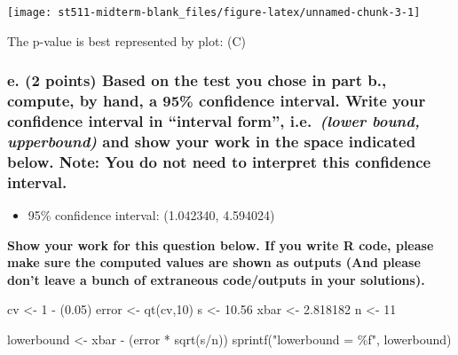 \documentclass[
]{article}
\newenvironment{Shaded}{\begin{snugshade}}{\end{snugshade}}
\newcommand{\DecValTok}[1]{\textcolor[rgb]{0.00,0.00,0.81}{#1}}
\newcommand{\FloatTok}[1]{\textcolor[rgb]{0.00,0.00,0.81}{#1}}
\newcommand{\FunctionTok}[1]{\textcolor[rgb]{0.00,0.00,0.00}{#1}}
\newcommand{\NormalTok}[1]{#1}
\newcommand{\OtherTok}[1]{\textcolor[rgb]{0.56,0.35,0.01}{#1}}
\newcommand{\SpecialCharTok}[1]{\textcolor[rgb]{0.00,0.00,0.00}{#1}}
\newcommand{\StringTok}[1]{\textcolor[rgb]{0.31,0.60,0.02}{#1}}
\providecommand{\tightlist}{%
  \setlength{\itemsep}{0pt}\setlength{\parskip}{0pt}}
\begin{document}
\begin{center}\texttt{[image: st511-midterm-blank\_files/figure-latex/unnamed-chunk-3-1]} \end{center}

The p-value is best represented by plot: (C)

\hypertarget{e.-2-points-based-on-the-test-you-chose-in-part-b.-compute-by-hand-a-95-confidence-interval.-write-your-confidence-interval-in-interval-form-i.e.-lower-bound-upperbound-and-show-your-work-in-the-space-indicated-below.-note-you-do-not-need-to-interpret-this-confidence-interval.}{%
\subsubsection{\texorpdfstring{e. (2 points) Based on the test you chose
in part b., compute, by hand, a 95\% confidence interval. Write your
confidence interval in ``interval form'', i.e.~\emph{(lower bound,
upperbound)} and show your work in the space indicated below. Note: You
do not need to interpret this confidence
interval.}{e. (2 points) Based on the test you chose in part b., compute, by hand, a 95\% confidence interval. Write your confidence interval in ``interval form'', i.e.~(lower bound, upperbound) and show your work in the space indicated below. Note: You do not need to interpret this confidence interval.}}\label{e.-2-points-based-on-the-test-you-chose-in-part-b.-compute-by-hand-a-95-confidence-interval.-write-your-confidence-interval-in-interval-form-i.e.-lower-bound-upperbound-and-show-your-work-in-the-space-indicated-below.-note-you-do-not-need-to-interpret-this-confidence-interval.}}

\begin{itemize}
\tightlist
\item
  95\% confidence interval: (1.042340, 4.594024)
\end{itemize}

\textbf{Show your work for this question below. If you write R code,
please make sure the computed values are shown as outputs (And please
don't leave a bunch of extraneous code/outputs in your solutions).}

\begin{Shaded}
\begin{Highlighting}[]
\NormalTok{cv }\OtherTok{\textless{}{-}} \DecValTok{1} \SpecialCharTok{{-}}\NormalTok{ (}\FloatTok{0.05}\NormalTok{)}
\NormalTok{error }\OtherTok{\textless{}{-}} \FunctionTok{qt}\NormalTok{(cv,}\DecValTok{10}\NormalTok{)}
\NormalTok{s }\OtherTok{\textless{}{-}} \FloatTok{10.56} 
\NormalTok{xbar }\OtherTok{\textless{}{-}} \FloatTok{2.818182}
\NormalTok{n }\OtherTok{\textless{}{-}} \DecValTok{11}

\NormalTok{lowerbound }\OtherTok{\textless{}{-}}\NormalTok{ xbar }\SpecialCharTok{{-}}\NormalTok{ (error }\SpecialCharTok{*} \FunctionTok{sqrt}\NormalTok{(s}\SpecialCharTok{/}\NormalTok{n))}
\FunctionTok{sprintf}\NormalTok{(}\StringTok{"lowerbound = \%f"}\NormalTok{, lowerbound)}
\end{Highlighting}
\end{Shaded}
\end{document}
